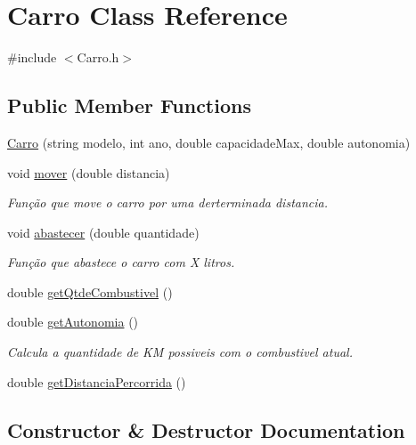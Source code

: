 \hypertarget{classCarro}{}\section{Carro Class Reference}
\label{classCarro}


{\ttfamily \#include $<$Carro.\+h$>$}

\subsection*{Public Member Functions}
\begin{DoxyCompactItemize}
\item 
\hyperlink{classCarro_ac4bb053a4a8498a29691ffe59d1e5083}{Carro} (string modelo, int ano, double capacidade\+Max, double autonomia)
\item 
void \hyperlink{classCarro_aae2b769087b2604569d393886e61dfa2}{mover} (double distancia)
\begin{DoxyCompactList}\small\item\em Função que move o carro por uma derterminada distancia. \end{DoxyCompactList}\item 
void \hyperlink{classCarro_ac0ea2f931753e6ac5b052663e82977fa}{abastecer} (double quantidade)
\begin{DoxyCompactList}\small\item\em Função que abastece o carro com X litros. \end{DoxyCompactList}\item 
double \hyperlink{classCarro_a1150918964334e854ac75bab0f6ca3c9}{get\+Qtde\+Combustivel} ()
\item 
double \hyperlink{classCarro_ab078cb1517fac448d0700601c4d90357}{get\+Autonomia} ()
\begin{DoxyCompactList}\small\item\em Calcula a quantidade de KM possiveis com o combustivel atual. \end{DoxyCompactList}\item 
double \hyperlink{classCarro_a7577028b357df8ca0207096c2f7086da}{get\+Distancia\+Percorrida} ()
\end{DoxyCompactItemize}


\subsection{Constructor \& Destructor Documentation}
